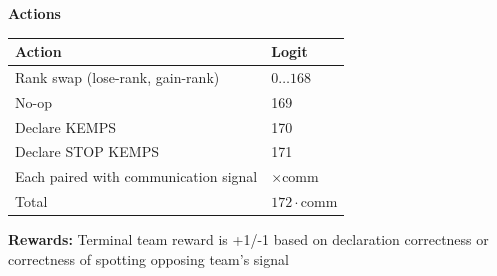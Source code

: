 \textbf{Actions}
\begin{center}
    \begin{tabular}{ll}
    \hline
        Action & Logit \\ \hline
        Rank swap (lose-rank, gain-rank) & $0 \ldots 168$ \\
        No-op & 169 \\
        Declare KEMPS & 170 \\
        Declare STOP KEMPS & 171 \\
        Each paired with communication signal & $\times \text{comm}$ \\
        \hline
        Total & $172 \cdot \text{comm}$ \\
        \hline
    \end{tabular}
\end{center}

\textbf{Rewards:} Terminal team reward is +1/-1 based on declaration correctness or correctness of spotting opposing team's signal